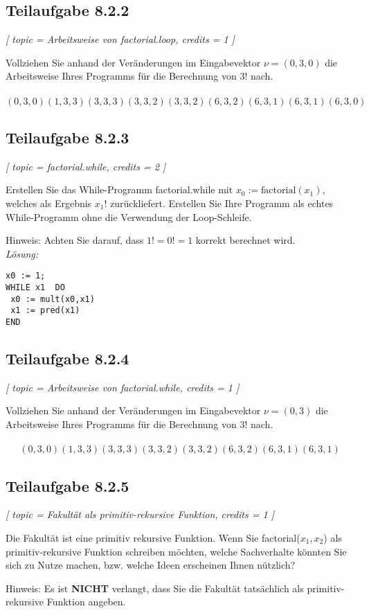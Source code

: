 \documentclass[12pt]{article}
\begin{document}
 \subsection*{Teilaufgabe 8.2.2} 
\textit{[ 
 topic = Arbeitsweise von factorial.loop, 
 credits = 1 
 ] }
  
 Vollziehen Sie anhand der Veränderungen im Eingabevektor $\nu =(0,3,0)$ die Arbeitsweise Ihres Programms für die Berechnung von 3! nach.  \\
 \textbf{ 
}\\
$$(0,3,0) 
 (1,3,3)  (3,3,3)  (3,3,2)  (3,3,2) (6,3,2)  (6,3,1)  (6,3,1)  (6,3,0)$$  
  
  
  
  \subsection*{Teilaufgabe 8.2.3} 
\textit{[ 
 topic = factorial.while, 
 credits = 2 
 ] }
  
 Erstellen Sie das While-Programm factorial.while mit $x_0 := \text{factorial}(x_1)$, welches als Ergebnis $x_1!$ zurückliefert. Erstellen Sie Ihre Programm als echtes While-Programm ohne die Verwendung der Loop-Schleife. 
  
 Hinweis: Achten Sie darauf, dass $1! = 0! = 1$ korrekt berechnet wird. \\ 
  \emph{  Lösung:}  
  \begin{lstlisting}[frame=single] 
x0 := 1;
WHILE x1  DO 
 x0 := mult(x0,x1)
 x1 := pred(x1)
END
\end{lstlisting}
  
  
  
  \subsection*{Teilaufgabe 8.2.4} 
\textit{[ 
 topic = Arbeitsweise von factorial.while, 
 credits = 1 
 ]} 
  
 Vollziehen Sie anhand der Veränderungen im Eingabevektor $\nu =(0,3)$ die Arbeitsweise Ihres Programms für die Berechnung von 3! nach.\\
 \textbf{ 
}\\
$$(0,3,0) 
 (1,3,3)  (3,3,3)  (3,3,2)  (3,3,2) (6,3,2)  (6,3,1)  (6,3,1)  $$    
  
  
 \subsection*{Teilaufgabe 8.2.5} 
\textit{[ 
 topic = Fakultät als primitiv-rekursive Funktion, 
 credits = 1 
 ] }
  
 Die Fakultät ist eine primitiv rekursive Funktion. Wenn Sie factorial($x_1,x_2$) als primitiv-rekursive Funktion schreiben möchten, welche Sachverhalte könnten Sie sich zu Nutze machen, bzw. welche Ideen erscheinen Ihnen nützlich? 
  
 Hinweis: Es ist \textbf{NICHT} verlangt, dass Sie die Fakultät tatsächlich als primitiv-rekursive Funktion angeben. 
  
  
  
  
  
 
\end{document}
